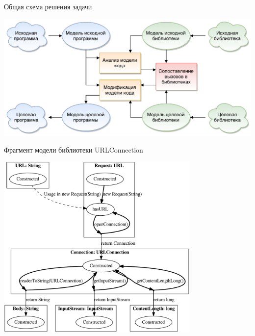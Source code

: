 \documentclass[12pt]{beamer}
\begin{document}
\begin{frame}{Общая схема решения задачи}
\begin{center}
\includegraphics[width=\textwidth]{scheme.pdf}
\end{center}
\end{frame}

\begin{frame}{Фрагмент модели библиотеки URLConnection}
\begin{center}
	\includegraphics[width=0.75\textwidth]{java-cropped.pdf}
\end{center}
\end{frame}
\end{document}
